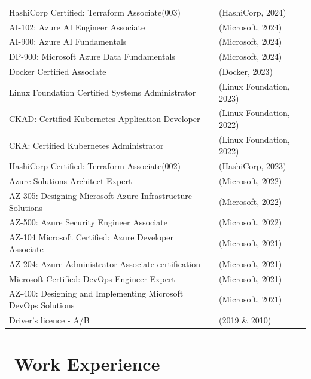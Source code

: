 \documentclass[a4paper,8pt]{article}
\begin{document}
\begin{tabular}{l l}
HashiCorp Certified: Terraform Associate(003) & (HashiCorp, 2024) \\
AI-102: Azure AI Engineer Associate & (Microsoft, 2024) \\
AI-900: Azure AI Fundamentals & (Microsoft, 2024) \\
DP-900: Microsoft Azure Data Fundamentals  &(Microsoft, 2024) \\
Docker Certified Associate & (Docker, 2023) \\
Linux Foundation Certified Systems Administrator & (Linux Foundation, 2023) \\
CKAD: Certified Kubernetes Application Developer & (Linux Foundation, 2022) \\
CKA: Certified Kubernetes Administrator & (Linux Foundation, 2022) \\
HashiCorp Certified: Terraform Associate(002) &(HashiCorp, 2023) \\
Azure Solutions Architect Expert & (Microsoft, 2022) \\
AZ-305: Designing Microsoft Azure Infrastructure Solutions & (Microsoft, 2022) \\
AZ-500: Azure Security Engineer Associate & (Microsoft, 2022) \\
AZ-104 Microsoft Certified: Azure Developer Associate & (Microsoft, 2021) \\
AZ-204: Azure Administrator Associate certification & (Microsoft, 2021) \\
Microsoft Certified: DevOps Engineer Expert & (Microsoft, 2021) \\
AZ-400: Designing and Implementing Microsoft DevOps Solutions & (Microsoft, 2021) \\
    Driver's licence - A/B & (2019 \& 2010)
\end{tabular}


\section{\faBriefcase\ Work Experience}
\end{document}
